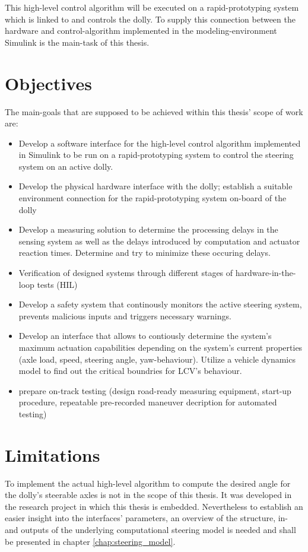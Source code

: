 \documentclass[ExampleMasters.tex]{subfiles}
\begin{document}
This high-level control algorithm will be executed on a rapid-prototyping system which is linked to and controls the dolly. To supply this connection between the hardware and control-algorithm implemented in the modeling-environment Simulink is the main-task of this thesis.    

\section{Objectives}
\label{sec:objectives}
The main-goals that are supposed to be achieved within this thesis' scope of work are: 

\begin{itemize}
	\item{Develop a software interface for the high-level control algorithm implemented in Simulink to be run on a rapid-prototyping system to control the steering system on an active dolly. }
	\item{Develop the physical hardware interface with the dolly; establish a suitable environment connection for the rapid-prototyping system on-board of the dolly} 
	\item{Develop a measuring solution to determine the processing delays in the sensing system as well as the delays introduced by computation and actuator reaction times. Determine and try to minimize these occuring delays.}  
	\item{Verification of designed systems through different stages of hardware-in-the-loop tests (HIL)}
	\item{Develop a safety system that continously monitors the active steering system, prevents malicious inputs and triggers necessary warnings.}
	\item{Develop an interface that allows to contiously determine the system's maximum actuation capabilities depending on the system's current properties (axle load, speed, steering angle, yaw-behaviour). Utilize a vehicle dynamics model to find out the critical boundries for LCV's behaviour.}	
	\item{prepare on-track testing (design road-ready measuring equipment, start-up procedure, repeatable pre-recorded maneuver decription for automated testing)}
	
\end{itemize}



\section{Limitations}
\label{sec:limitations}
To implement the actual high-level algorithm to compute the desired angle for the dolly's steerable axles is not in the scope of this thesis. It was developed in the research project in which this thesis is embedded. Nevertheless to establish an easier insight into the interfaces' parameters, an overview of the structure, in- and outputs of the underlying computational steering model is needed and shall be presented in chapter \ref{chap:steering_model}. 
\end{document}
